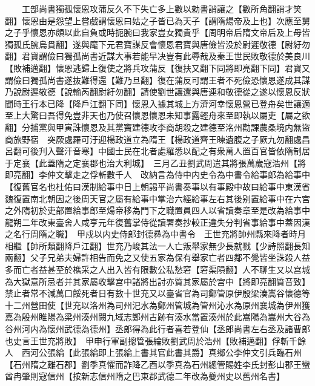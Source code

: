 　　工部尚書獨孤懷恩攻蒲反久不下失亡多上數以勑書誚讓之【數所角翻誚才笑翻】懷恩由是怨望上嘗戲謂懷恩曰姑之子皆已為天子【謂隋煬帝及上也】次應至舅之子乎懷恩亦頗以此自負或時扼腕曰我家豈女獨貴乎【周明帝后隋文帝后及上母皆獨孤氏腕烏貫翻】遂與麾下元君寶謀反會懷恩君寶與唐儉皆没於尉遲敬德【尉紆勿翻】君寶謂儉曰獨孤尚書近謀大事若能早决豈有此辱哉及秦王世民敗敬德於美良川【敗補邁翻】懷恩逃歸上復使之將兵攻蒲反【復扶又翻下同將即亮翻下同】君寶又謂儉曰獨孤尚書遂抜難得還【難乃旦翻】復在蒲反可謂王者不死儉恐懷恩遂成其謀乃說尉遲敬德【說輸芮翻尉紆勿翻】請使劉世讓還與唐連和敬德從之遂以懷恩反狀聞時王行本已降【降戶江翻下同】懷恩入據其城上方濟河幸懷恩營已登舟矣世讓適至上大驚曰吾得免豈非天也乃使召懷恩懷恩未知事露輕舟來至即執以屬吏【屬之欲翻】分捕黨與甲寅誅懷恩及其黨竇建德攻李商胡殺之建德至洺州勸課農桑境内無盜商旅野宿　突厥處羅可汙迎楊政道立為隋王【楊政道齊王暕遺腹之子厥九勿翻處昌呂翻可後刋入聲汗音寒】中國士民在北者處羅悉以配之有衆萬人置百官皆依隋制居于定襄【此蓋隋之定襄郡也治大利城】　三月乙丑劉武周遣其將張萬歲寇浩州【將即亮翻】李仲文擊走之俘斬數千人　改納言為侍中内史令為中書令給事郎為給事中【復舊官名也杜佑曰漢制給事中日上朝謁平尚書奏事以有事殿中故曰給事中東漢省魏復置南北朝因之後周天官之屬有給事中掌治六經給事左右其後别置給事中在六宫之外隋初於吏部置給事郎至煬帝移為門下之職置員四人以省讀奏章至是改為給事中龍朔二年改東臺舍人咸亨元年復舊掌侍從讀署奏抄較正違失分判省事給事中蓋因漢之名行周隋之職】　甲戍以内史侍郎封德彞為中書令　王世充將帥州縣來降者時月相繼【帥所類翻降戶江翻】世充乃峻其法一人亡叛舉家無少長就戮【少詩照翻長知兩翻】父子兄弟夫婦許相告而免之又使五家為保有舉家亡者四鄰不覺皆坐誅殺人益多而亡者益甚至於樵采之人出入皆有限數公私愁窘【窘渠隕翻】人不聊生又以宫城為大獄意所忌者并其家屬收擊宫中諸將出討亦質其家屬於宫中【將即亮翻質音致】禁止者常不減萬口餒死者日有數十世充又以臺省官為司鄭管原伊殷梁湊嵩谷懷德等十二州營田使【世充以洛州為司州汜水為鄭州管城為管州沁水為原州襄城為伊州獲嘉為殷州睢陽為梁州湊州闕九域志鄭州古跡有湊水當置湊州於此嵩陽為嵩州大谷為谷州河内為懷州武德為德州】丞郎得為此行者喜若登仙【丞郎尚書左右丞及諸曹郎也史言王世充將敗】　甲申行軍副摠管張綸敗劉武周於浩州【敗補邁翻】俘斬千餘人　西河公張綸【此張綸即上張綸上書其官此書其爵】真鄉公李仲文引兵臨石州【石州隋之離石郡】劉季真懼而詐降乙酉以季真為石州總管賜姓李氏封彭山郡王蠻酋冉肇則寇信州【按新志信州隋之巴東郡武德二年改為夔州史以舊州名書】

